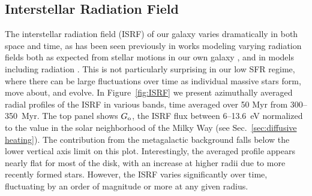 \documentclass[twocolumn]{aastex61}
\begin{document}
\subsection{Interstellar Radiation Field}
\label{sec:ISRF}

The interstellar radiation field (ISRF) of our galaxy varies dramatically in both space and time, as has been seen previously in works modeling varying radiation fields both as expected from stellar motions in our own galaxy \citep{Parravano2003}, and in models including radiation \citep[e.g.][]{Hu2017}. This is not particularly surprising in our low SFR regime, where there can be large fluctuations over time as individual massive stars form, move about, and evolve. In Figure~\ref{fig:ISRF} we present azimuthally averaged radial profiles of the ISRF in various bands, time averaged over 50 Myr from 300--350~Myr. The top panel shows $G_{\rm o}$, the ISRF flux between 6--13.6~eV normalized to the value in the solar neighborhood of the Milky Way (see Sec.~\ref{sec:diffusive heating}). The contribution from the metagalactic background falls below the lower vertical axis limit on this plot. Interestingly, the averaged profile appears nearly flat for most of the disk, with an increase at higher radii due to more recently formed stars. However, the ISRF varies significantly over time, fluctuating by an order of magnitude or more at any given radius. 
\end{document}
